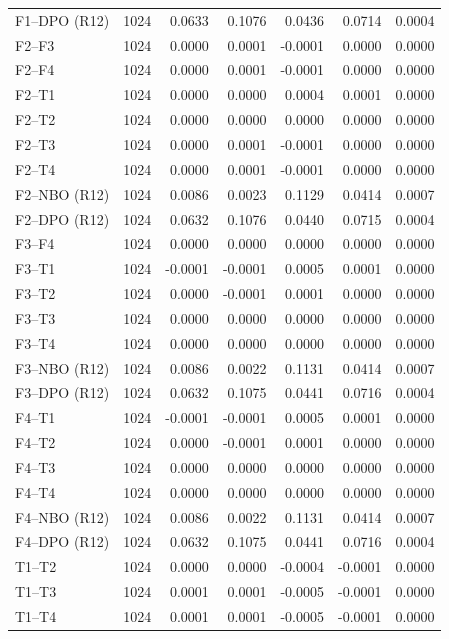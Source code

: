 \begin{longtable}{lrrrrrr}
F1--DPO (R12) & 1024 & 0.0633 & 0.1076 & 0.0436 & 0.0714 & 0.0004 \\
F2--F3 & 1024 & 0.0000 & 0.0001 & -0.0001 & 0.0000 & 0.0000 \\
F2--F4 & 1024 & 0.0000 & 0.0001 & -0.0001 & 0.0000 & 0.0000 \\
F2--T1 & 1024 & 0.0000 & 0.0000 & 0.0004 & 0.0001 & 0.0000 \\
F2--T2 & 1024 & 0.0000 & 0.0000 & 0.0000 & 0.0000 & 0.0000 \\
F2--T3 & 1024 & 0.0000 & 0.0001 & -0.0001 & 0.0000 & 0.0000 \\
F2--T4 & 1024 & 0.0000 & 0.0001 & -0.0001 & 0.0000 & 0.0000 \\
F2--NBO (R12) & 1024 & 0.0086 & 0.0023 & 0.1129 & 0.0414 & 0.0007 \\
F2--DPO (R12) & 1024 & 0.0632 & 0.1076 & 0.0440 & 0.0715 & 0.0004 \\
F3--F4 & 1024 & 0.0000 & 0.0000 & 0.0000 & 0.0000 & 0.0000 \\
F3--T1 & 1024 & -0.0001 & -0.0001 & 0.0005 & 0.0001 & 0.0000 \\
F3--T2 & 1024 & 0.0000 & -0.0001 & 0.0001 & 0.0000 & 0.0000 \\
F3--T3 & 1024 & 0.0000 & 0.0000 & 0.0000 & 0.0000 & 0.0000 \\
F3--T4 & 1024 & 0.0000 & 0.0000 & 0.0000 & 0.0000 & 0.0000 \\
F3--NBO (R12) & 1024 & 0.0086 & 0.0022 & 0.1131 & 0.0414 & 0.0007 \\
F3--DPO (R12) & 1024 & 0.0632 & 0.1075 & 0.0441 & 0.0716 & 0.0004 \\
F4--T1 & 1024 & -0.0001 & -0.0001 & 0.0005 & 0.0001 & 0.0000 \\
F4--T2 & 1024 & 0.0000 & -0.0001 & 0.0001 & 0.0000 & 0.0000 \\
F4--T3 & 1024 & 0.0000 & 0.0000 & 0.0000 & 0.0000 & 0.0000 \\
F4--T4 & 1024 & 0.0000 & 0.0000 & 0.0000 & 0.0000 & 0.0000 \\
F4--NBO (R12) & 1024 & 0.0086 & 0.0022 & 0.1131 & 0.0414 & 0.0007 \\
F4--DPO (R12) & 1024 & 0.0632 & 0.1075 & 0.0441 & 0.0716 & 0.0004 \\
T1--T2 & 1024 & 0.0000 & 0.0000 & -0.0004 & -0.0001 & 0.0000 \\
T1--T3 & 1024 & 0.0001 & 0.0001 & -0.0005 & -0.0001 & 0.0000 \\
T1--T4 & 1024 & 0.0001 & 0.0001 & -0.0005 & -0.0001 & 0.0000 \\

\end{longtable}
